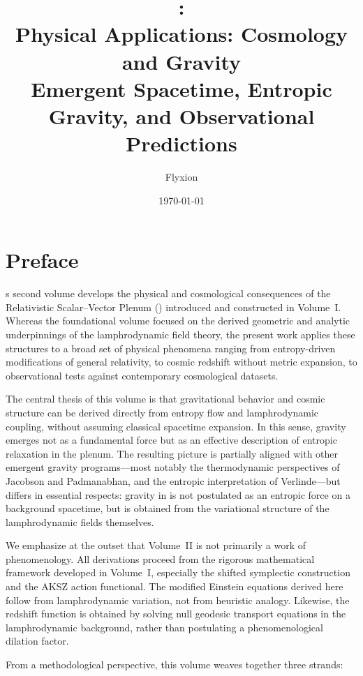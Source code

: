 \documentclass[11pt]{book}
\title{\rsvptitle:\\
Physical Applications: Cosmology and Gravity\\[4pt]
\Large Emergent Spacetime, Entropic Gravity, and Observational Predictions}
\author{Flyxion}
\date{\today}
\begin{document}
\frontmatter
\maketitle

\chapter*{Preface}

s second volume develops the physical and cosmological consequences of the
Relativistic Scalar--Vector Plenum (\rsvpabbr{}) introduced and constructed in
Volume~I. Whereas the foundational volume focused on the derived geometric and
analytic underpinnings of the lamphrodynamic field theory, the present work
applies these structures to a broad set of physical phenomena ranging from
entropy-driven modifications of general relativity, to cosmic redshift without
metric expansion, to observational tests against contemporary cosmological
datasets.

The central thesis of this volume is that gravitational behavior and cosmic
structure can be derived directly from entropy flow and lamphrodynamic coupling,
without assuming classical spacetime expansion. In this sense, gravity emerges
not as a fundamental force but as an effective description of entropic
relaxation in the plenum. The resulting picture is partially aligned with other
emergent gravity programs---most notably the thermodynamic perspectives of
Jacobson and Padmanabhan, and the entropic interpretation of Verlinde---but
differs in essential respects: gravity in \rsvpabbr{} is not postulated as an
entropic force on a background spacetime, but is obtained from the variational
structure of the lamphrodynamic fields themselves.

We emphasize at the outset that Volume~II is not primarily a work of
phenomenology. All derivations proceed from the rigorous mathematical framework
developed in Volume~I, especially the shifted symplectic construction and the
AKSZ action functional. The modified Einstein equations derived here follow from
lamphrodynamic variation, not from heuristic analogy. Likewise, the redshift
function is obtained by solving null geodesic transport equations in the
lamphrodynamic background, rather than postulating a phenomenological
dilation factor.

From a methodological perspective, this volume weaves together three strands:
\end{document}
